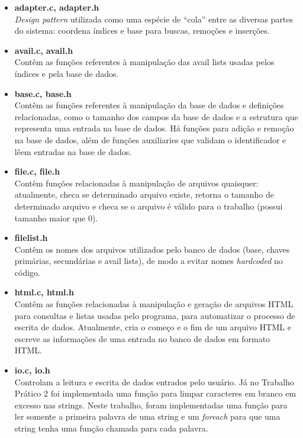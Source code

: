 \documentclass{article}
\begin{document}
\begin{itemize}
\item \textbf{adapter.c, adapter.h}\\
	\textit{Design pattern} utilizada como uma espécie de ``cola'' entre as diversas partes do sistema: coordena índices e base para buscas, remoções e inserções.

\item \textbf{avail.c, avail.h}\\
	Contêm as funções referentes à manipulação das avail lists usadas pelos índices e pela base de dados.

\item \textbf{base.c, base.h}\\
	Contêm as funções referentes à manipulação da base de dados e definições relacionadas, como o tamanho dos campos da base de dados e a estrutura que representa uma entrada na base de dados. Há funções para adição e remoção na base de dados, além de funções auxiliaries que validam o identificador e lêem entradas na base de dados.

 \item \textbf{file.c, file.h}\\
	Contêm funções relacionadas à manipulação de arquivos quaisquer: atualmente, checa se determinado arquivo existe, retorna o tamanho de determinado arquivo e checa se o arquivo é válido para o trabalho (possui tamanho maior que 0).

\item \textbf{filelist.h}\\
	Contêm os nomes dos arquivos utilizados pelo banco de dados (base, chaves primárias, secundárias e avail lists), de modo a evitar nomes \textit{hardcoded} no código.

 \item \textbf{html.c, html.h}\\
	Contêm as funções relacionadas à manipulação e geração de arquivos HTML para consultas e listas usadas pelo programa, para automatizar o processo de escrita de dados. Atualmente, cria o começo e o fim de um arquivo HTML e escreve as informações de uma entrada no banco de dados em formato HTML.

 \item \textbf{io.c, io.h}\\
	Controlam a leitura e escrita de dados entrados pelo usuário. Já no Trabalho Prático 2 foi implementada uma função para limpar caracteres em branco em excesso nas strings. Neste trabalho, foram implementadas uma função para ler somente a primeira palavra de uma string e um \textit{foreach} para que uma string tenha uma função chamada para cada palavra.


\end{itemize}
\end{document}
